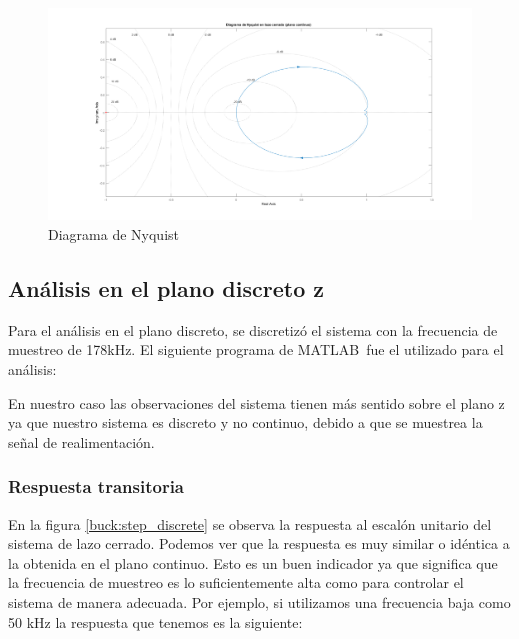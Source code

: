 \documentclass[12pt]{report}
\begin{document}
	\begin{figure}
		\centering
		\includegraphics[width=\textwidth,height=\textheight,keepaspectratio]{buck_nyquist} 
		\caption{Diagrama de Nyquist}
		\label{buck:nyquist}
	\end{figure}

	\newpage
	\subsection{Análisis en el plano discreto z}

	Para el análisis en el plano discreto, se discretizó el sistema con la frecuencia de muestreo de 178kHz. El siguiente programa de MATLAB\textregistered \ fue el utilizado para el análisis:
	
	
	
	En nuestro caso las observaciones del sistema tienen más sentido sobre el plano z ya que nuestro sistema es discreto y no continuo, debido a que se muestrea la señal de realimentación. 
	
	\subsubsection{Respuesta transitoria}
	
	En la figura \ref{buck:step_discrete} se observa la respuesta al escalón unitario del sistema de lazo cerrado. Podemos ver que la respuesta es muy similar o idéntica a la obtenida en el plano continuo. Esto es un buen indicador ya que significa que la frecuencia de muestreo es lo suficientemente alta como para controlar el sistema de manera adecuada. Por ejemplo, si utilizamos una frecuencia baja como 50 kHz la respuesta que tenemos es la siguiente:
	
\end{document}
